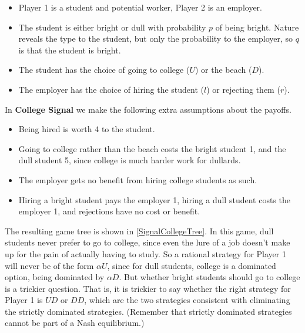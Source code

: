 \documentclass[openany]{book}
\newcommand{\eqm}{equilibrium}
\begin{document}
\begin{itemize}
\item Player 1 is a student and potential worker, Player 2 is an employer.
\item The student is either bright or dull with probability $p$ of being bright. Nature reveals the type to the student, but only the probability to the employer, so $q$ is that the student is bright.
\item The student has the choice of going to college ($U$) or the beach ($D$).
\item The employer has the choice of hiring the student ($l$) or rejecting them ($r$).
\end{itemize}
In \textbf{College Signal} we make the following extra assumptions about the payoffs.

\begin{itemize}
\item Being hired is worth 4 to the student.
\item Going to college rather than the beach costs the bright student 1, and the dull student 5, since college is much harder work for dullards.
\item The employer gets no benefit from hiring college students as such.
\item Hiring a bright student pays the employer 1, hiring a dull student costs the employer 1, and rejections have no cost or benefit.
\end{itemize}
The resulting game tree is shown in \ref{SignalCollegeTree}. In this game, dull students never prefer to go to college, since even the lure of a job doesn't make up for the pain of actually having to study. So a rational strategy for Player 1 will never be of the form $\alpha U$, since for dull students, college is a dominated option, being dominated by $\alpha D$. But whether bright students should go to college is a trickier question. That is, it is trickier to say whether the right strategy for Player 1 is $UD$ or $DD$, which are the two strategies consistent with eliminating the strictly dominated strategies. (Remember that strictly dominated strategies cannot be part of a Nash \eqm.)
\end{document}
